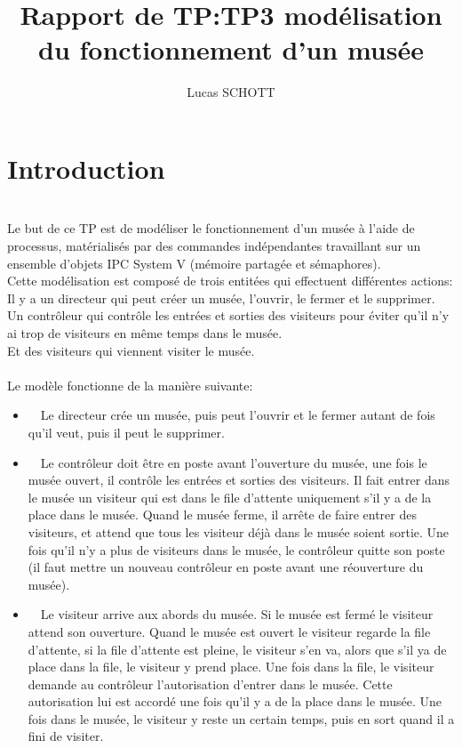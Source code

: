 \documentclass[a4paper,12pt,DIV=16]{scrreprt}
\title{Rapport de TP:\@ TP3 modélisation du fonctionnement d'un musée}
\author{Lucas SCHOTT}
\begin{document}
    \maketitle


    \section*{Introduction}
     
    \\

    Le but de ce TP est de modéliser le fonctionnement d'un musée à l’aide de
    processus, matérialisés par des commandes indépendantes travaillant sur un
    ensemble d’objets IPC System V (mémoire partagée et sémaphores).\\

    Cette modélisation est composé de trois entitées qui effectuent différentes
    actions:\\
    Il y a un directeur qui peut créer un musée, l'ouvrir, le fermer
    et le supprimer.\\
    Un contrôleur qui contrôle les entrées et sorties des
    visiteurs pour éviter qu'il n'y ai trop de visiteurs en même temps dans le
    musée.\\
    Et des visiteurs qui viennent visiter le musée.\\ \\


    Le modèle fonctionne de la manière suivante:
    \begin{itemize}
        \item   Le directeur crée un musée, puis peut l'ouvrir et le fermer
            autant de fois qu'il veut, puis il peut le supprimer.
        \item   Le contrôleur doit être en poste avant l'ouverture du musée,
            une fois le musée ouvert, il contrôle les entrées et sorties des
            visiteurs. Il fait entrer dans le musée un visiteur qui est dans le
            file d'attente uniquement s'il y a de la place dans le musée. Quand
            le musée ferme, il arrête de faire entrer des visiteurs, et attend
            que tous les visiteur déjà dans le musée soient sortie. Une fois
            qu'il n'y a plus de visiteurs dans le musée, le contrôleur quitte
            son poste (il faut mettre un nouveau contrôleur en poste avant une
            réouverture du musée).
        \item   Le visiteur arrive aux abords du musée. Si le musée est fermé
            le visiteur attend son ouverture. Quand le musée est ouvert le
            visiteur regarde la file d'attente, si la file d'attente est
            pleine, le visiteur s'en va, alors que s'il ya de place dans la
            file, le visiteur y prend place. Une fois dans la file, le visiteur
            demande au contrôleur l'autorisation d'entrer dans le musée. Cette
            autorisation lui est accordé une fois qu'il y a de la place dans le
            musée. Une fois dans le musée, le visiteur y reste un certain
            temps, puis en sort quand il a fini de visiter.
    \end{itemize}
\end{document}
